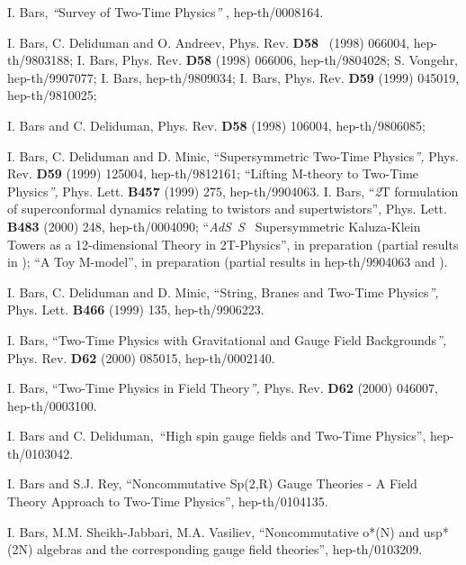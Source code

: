 \documentclass[a4paper,12pt]{article}
\begin{document}
\begin{thebibliography}{99}
  I. Bars, \textit{``}Survey of Two-Time Physics\textit{''}%
, hep-th/0008164.

  I. Bars, C. Deliduman and O. Andreev, Phys. Rev. \textbf{D58%
} \ (1998) 066004, hep-th/9803188; I. Bars, Phys. Rev. \textbf{D58} (1998)
066006, hep-th/9804028; S. Vongehr, hep-th/9907077; I. Bars, hep-th/9809034;
I. Bars, Phys. Rev. \textbf{D59} (1999) 045019, hep-th/9810025;

  I. Bars and C. Deliduman, Phys. Rev. \textbf{D58} (1998)
106004, hep-th/9806085;

  I. Bars, C. Deliduman and D. Minic, ``Supersymmetric
Two-Time Physics\textit{'', }Phys. Rev. \textbf{D59} (1999) 125004,
hep-th/9812161; ``Lifting M-theory to Two-Time Physics\textit{'', }Phys.
Lett. \textbf{B457} (1999) 275, hep-th/9904063. \newline
I. Bars, ``\textit{2}T formulation of superconformal dynamics relating to
twistors and supertwistors'', Phys. Lett. \textbf{B483} (2000) 248,
hep-th/0004090; ``\textit{AdS}\coordHE{}\textit{\ S}\coordHE{}\textit{\ }%
Supersymmetric Kaluza-Klein Towers as a 12-dimensional Theory in
2T-Physics'', in preparation (partial results in \cite{survey2T}); ``A Toy
M-model'', in preparation (partial results in hep-th/9904063 and \cite
{survey2T}).

  I. Bars, C. Deliduman and D. Minic, ``String, Branes and
Two-Time Physics\textit{'', }Phys. Lett. \textbf{B466} (1999) 135,
hep-th/9906223.

  I. Bars, ``Two-Time Physics with Gravitational and Gauge
Field Backgrounds\textit{'', }Phys. Rev. \textbf{D62} (2000) 085015,
hep-th/0002140.

  I. Bars, ``Two-Time Physics in Field Theory\textit{'', }%
Phys. Rev. \textbf{D62} (2000) 046007, hep-th/0003100.

  I. Bars and C. Deliduman,\ ``High spin gauge fields and
Two-Time Physics'', hep-th/0103042.

  I. Bars and S.J. Rey, ``Noncommutative Sp(2,R) Gauge
Theories - A Field Theory Approach to Two-Time Physics'', hep-th/0104135.

  I. Bars, M.M. Sheikh-Jabbari, M.A. Vasiliev,
``Noncommutative o*(N) and usp*(2N) algebras and the corresponding gauge
field theories'', hep-th/0103209.


\end{thebibliography}
\end{document}
